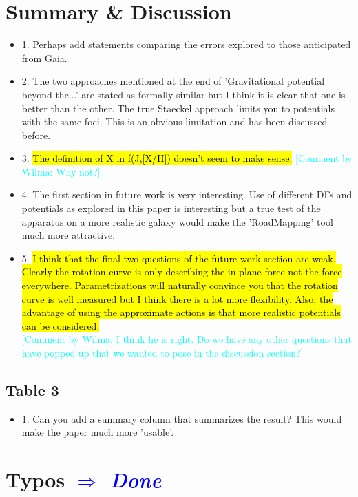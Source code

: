 \documentclass[10pt,a4paper]{article}
\newcommand{\HW}[1]{\textcolor{Cyan}{#1}}
\newcommand{\Comment}[1]{\textsl{\textcolor{Blue}{$\Longrightarrow$ {#1}}}}
\begin{document}
\section{Summary \& Discussion}
\begin{itemize}
\item 1. Perhaps add statements comparing the errors explored to those anticipated from Gaia.
\item 2. The two approaches mentioned at the end of 'Gravitational potential beyond the...' are stated as formally similar but I think it is clear that one is better than the other. The true Staeckel approach limits you to potentials with the same foci. This is an obvious limitation and has been discussed before.
\item 3. \hl{The definition of X in f(J,[X/H]) doesn't seem to make sense.} \HW{[Comment by Wilma: Why not?]}
\item 4. The first section in future work is very interesting. Use of different DFs and potentials as explored in this paper is interesting but a true test of the apparatus on a more realistic galaxy would make the 'RoadMapping' tool much more attractive.
\item 5. \hl{I think that the final two questions of the future work section are weak. Clearly the rotation curve is only describing the in-plane force not the force everywhere. Parametrizations will naturally convince you that the rotation curve is well measured but I think there is a lot more flexibility. Also, the advantage of using the approximate actions is that more realistic potentials can be considered.} \\\HW{[Comment by Wilma: I think he is right. Do we have any other questions that have popped up that we wanted to pose in the discussion section?]}
\end{itemize}

\subsection{Table 3}
\begin{itemize}
\item 1. Can you add a summary column that summarizes the result? This would make the paper much more 'usable'.
\end{itemize}


\section{Typos \Comment{Done}}
\end{document}
